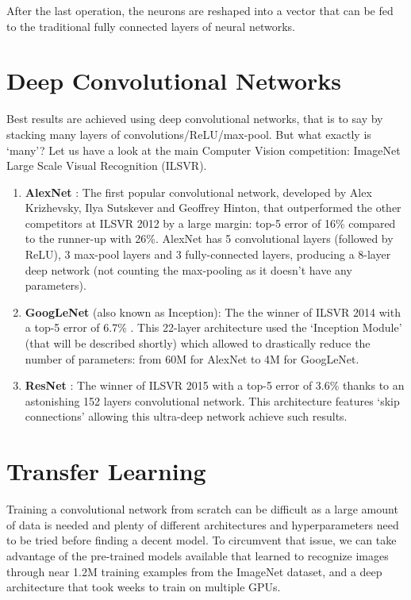 After the last operation, the neurons are reshaped into a vector that can be fed to the traditional fully connected layers of neural networks.

\section{Deep Convolutional Networks}
Best results are achieved using deep convolutional networks, that is to say by stacking many layers of convolutions/ReLU/max-pool. But what exactly is `many'? Let us have a look at the main Computer Vision competition: ImageNet Large Scale Visual Recognition (ILSVR).
\begin{enumerate}
    \item \textbf{AlexNet} \cite{alexnet}: The first popular convolutional network, developed by Alex Krizhevsky, Ilya Sutskever and Geoffrey Hinton, that outperformed 
    the other competitors at ILSVR 2012 by a large margin: top-5 error of 16\% compared to the runner-up with 26\%. AlexNet has 5 convolutional layers (followed by 
    ReLU), 3 max-pool layers and 3 fully-connected layers, producing a 8-layer deep network (not counting the max-pooling as it doesn't have any parameters).
    \item \textbf{GoogLeNet} (also known as Inception)\cite{googlenet}: The the winner of ILSVR 2014 with a top-5 error of 6.7\% . This 22-layer architecture used 
    the `Inception Module' (that will be described shortly) which allowed to drastically reduce the number of parameters: from 60M for AlexNet to 4M for GoogLeNet.
    \item \textbf{ResNet} \cite{resnet}: The winner of ILSVR 2015 with a top-5 error of 3.6\% thanks to an astonishing 152 layers convolutional network. This 
    architecture features `skip connections' allowing this ultra-deep network achieve such results.
\end{enumerate}

\section{Transfer Learning}
Training a convolutional network from scratch can be difficult as a large amount of data is needed and plenty of different architectures and hyperparameters need to be tried before finding a decent model. To circumvent that issue, we can take advantage of the pre-trained models available that learned to recognize images through near 1.2M training examples from the ImageNet dataset, and a deep architecture that took weeks to train on multiple GPUs.

